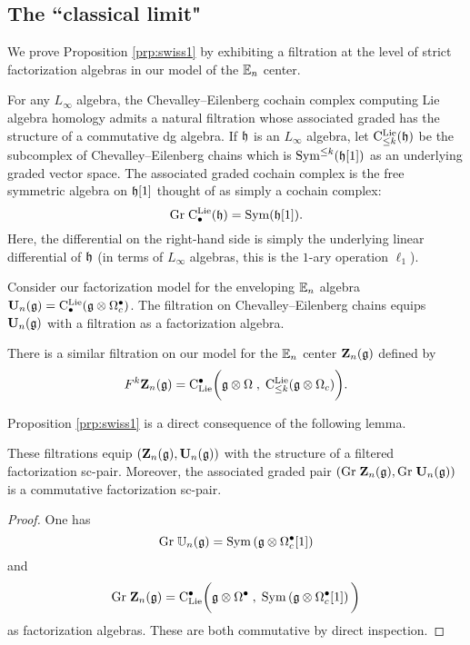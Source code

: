 \documentclass[11pt]{amsart}
\numberwithin{equation}{section}
\begin{document}

\subsection{The ``classical limit"}

We prove Proposition \ref{prp:swiss1} by exhibiting a filtration at the level of strict factorization algebras in our model of the $\mathbb E_n$ center. 

For any $L_\infty$ algebra, the Chevalley--Eilenberg cochain complex computing Lie algebra homology admits a natural filtration whose associated graded has the structure of a commutative dg algebra.
If $\mathfrak h$ is an $L_\infty$ algebra, let ${\rm C}^{\rm Lie}_{\leq k} (\mathfrak h)$ be the subcomplex of Chevalley--Eilenberg chains which is ${\rm Sym}^{\leq k} (\mathfrak h[1])$ as an underlying graded vector space. 
The associated graded cochain complex is the free symmetric algebra on $\mathfrak h[1]$ thought of as simply a cochain complex:
\[
{\rm Gr} \; {\rm C}^{\rm Lie}_\bullet (\mathfrak h) = {\rm Sym} (\mathfrak h [1])  .
\]
Here, the differential on the right-hand side is simply the underlying linear differential of $\mathfrak h$ (in terms of $L_\infty$ algebras, this is the $1$-ary operation $\ell_1$). 

Consider our factorization model for the enveloping $\mathbb E_n$ algebra $\mathbf U_n(\mathfrak g) = {\rm C}^{\rm Lie}_\bullet (\mathfrak g \otimes \Omega^\bullet_c)$. 
The filtration on Chevalley--Eilenberg chains equips $\mathbf U_n(\mathfrak g)$ with a filtration as a factorization algebra. 

There is a similar filtration on our model for the $\mathbb E_n$ center $\mathbf Z_n(\mathfrak g)$ defined by
\[
F^k \mathbf Z_n(\mathfrak g) = {\rm C}_{\rm Lie}^\bullet \bigg(\mathfrak g \otimes \Omega \; , \; {\rm C}^{\rm Lie}_{\leq k} (\mathfrak g \otimes \Omega_c) \bigg) .
\]

Proposition \ref{prp:swiss1} is a direct consequence of the following lemma.

\begin{lmm}
These filtrations equip $(\mathbf Z_n (\mathfrak g), \mathbf U_n(\mathfrak g))$ with the structure of a filtered factorization sc-pair.
Moreover, the associated graded pair $({\rm Gr} \; \mathbf Z_n (\mathfrak g), {\rm Gr} \; \mathbf U_n(\mathfrak g))$ is a commutative factorization sc-pair. 
\end{lmm}
\begin{proof}
One has
\[
{\rm Gr} \; \mathbb U_n (\mathfrak g) = {\rm Sym} \left(\mathfrak g \otimes \Omega^\bullet_c [1] \right)
\]
and
\[
{\rm Gr} \; \mathbf Z_n (\mathfrak g) = {\rm C}_{{\rm Lie}}^\bullet\bigg(\mathfrak g \otimes \Omega^\bullet \; , \; {\rm Sym} \left(\mathfrak g \otimes \Omega^\bullet_c [1]\right) \bigg) 
\]
as factorization algebras. 
These are both commutative by direct inspection. 
\end{proof}
\end{document}
